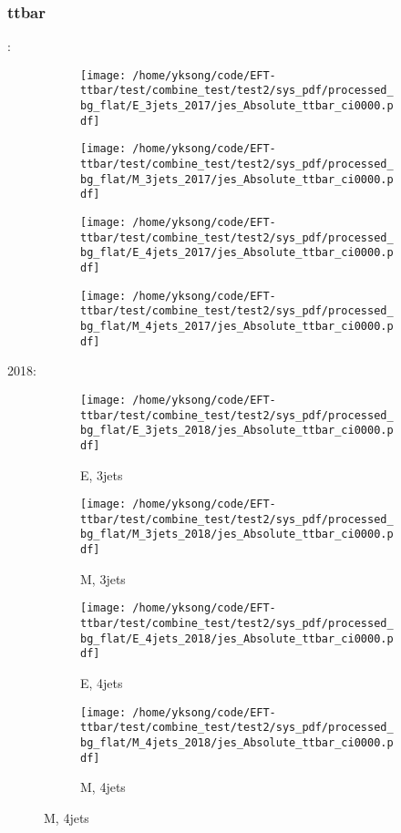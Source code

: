 \documentclass{beamer}
\begin{document}
\begin{frame}
\frametitle{ttbar}
\fontsize{5}{1}:
\begin{figure}
\centering
\begin{subfigure}[b]{0.24\textwidth}
\texttt{[image: /home/yksong/code/EFT-ttbar/test/combine\_test/test2/sys\_pdf/processed\_bg\_flat/E\_3jets\_2017/jes\_Absolute\_ttbar\_ci0000.pdf]}
\end{subfigure}
\begin{subfigure}[b]{0.24\textwidth}
\texttt{[image: /home/yksong/code/EFT-ttbar/test/combine\_test/test2/sys\_pdf/processed\_bg\_flat/M\_3jets\_2017/jes\_Absolute\_ttbar\_ci0000.pdf]}
\end{subfigure}
\begin{subfigure}[b]{0.24\textwidth}
\texttt{[image: /home/yksong/code/EFT-ttbar/test/combine\_test/test2/sys\_pdf/processed\_bg\_flat/E\_4jets\_2017/jes\_Absolute\_ttbar\_ci0000.pdf]}
\end{subfigure}
\begin{subfigure}[b]{0.24\textwidth}
\texttt{[image: /home/yksong/code/EFT-ttbar/test/combine\_test/test2/sys\_pdf/processed\_bg\_flat/M\_4jets\_2017/jes\_Absolute\_ttbar\_ci0000.pdf]}
\end{subfigure}
\end{figure}
2018:
\begin{figure}
\centering
\begin{subfigure}[b]{0.24\textwidth}
\texttt{[image: /home/yksong/code/EFT-ttbar/test/combine\_test/test2/sys\_pdf/processed\_bg\_flat/E\_3jets\_2018/jes\_Absolute\_ttbar\_ci0000.pdf]}
\captionsetup{font=tiny}
\caption{E, 3jets}
\end{subfigure}
\begin{subfigure}[b]{0.24\textwidth}
\texttt{[image: /home/yksong/code/EFT-ttbar/test/combine\_test/test2/sys\_pdf/processed\_bg\_flat/M\_3jets\_2018/jes\_Absolute\_ttbar\_ci0000.pdf]}
\captionsetup{font=tiny}
\caption{M, 3jets}
\end{subfigure}
\begin{subfigure}[b]{0.24\textwidth}
\texttt{[image: /home/yksong/code/EFT-ttbar/test/combine\_test/test2/sys\_pdf/processed\_bg\_flat/E\_4jets\_2018/jes\_Absolute\_ttbar\_ci0000.pdf]}
\captionsetup{font=tiny}
\caption{E, 4jets}
\end{subfigure}
\begin{subfigure}[b]{0.24\textwidth}
\texttt{[image: /home/yksong/code/EFT-ttbar/test/combine\_test/test2/sys\_pdf/processed\_bg\_flat/M\_4jets\_2018/jes\_Absolute\_ttbar\_ci0000.pdf]}
\captionsetup{font=tiny}
\caption{M, 4jets}
\end{subfigure}
\end{figure}
\end{frame}
\end{document}
